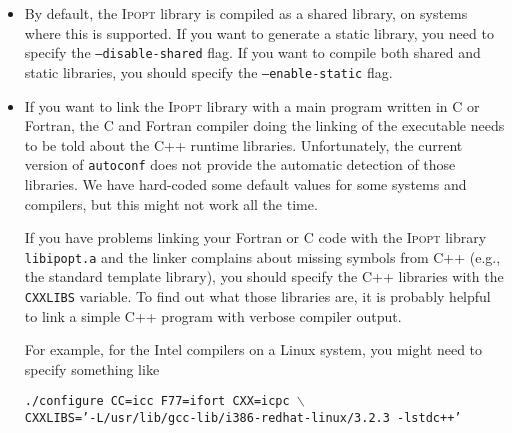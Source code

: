 \documentclass[10pt]{article}
\newcommand{\Ipopt}{\textsc{Ipopt}\xspace}
\begin{document}
\begin{itemize}
  {\tt ./configure CXX=g++-4.2.0 CC=gcc-4.2.0 F77=gfortran-4.2.0}

  In order to set the compiler flags, you should use the variables
  {\tt CXXFLAGS}, {\tt CFLAGS}, {\tt FFLAGS}.  Note, that the \Ipopt
  code uses ``{\tt dynamic\_cast}''.  Therefore it is necessary that
  the C++ code is compiled including RTTI (Run-Time Type Information).
  Some compilers need to be given special flags to do that (e.g.,
  ``{\tt -qrtti=dyna}'' for the AIX {\tt xlC} compiler).

  Please also check the generic COIN-OR help page at

  \centerline{\url{https://projects.coin-or.org/CoinHelp/wiki/user-configure\#GivingOptions}}

  for the description of more variables that can be set for {\tt
    configure}.

\item By default, the \Ipopt library is compiled as a shared library,
  on systems where this is supported.  If you want to generate a
  static library, you need to specify the {\tt --disable-shared}
  flag.  If you want to compile both shared and static libraries, you
  should specify the {\tt --enable-static} flag.

\item If you want to link the \Ipopt library with a main program
  written in C or Fortran, the C and Fortran compiler doing the
  linking of the executable needs to be told about the C++ runtime
  libraries.  Unfortunately, the current version of {\tt autoconf}
  does not provide the automatic detection of those libraries.  We
  have hard-coded some default values for some systems and compilers,
  but this might not work all the time.

  If you have problems linking your Fortran or C code with the \Ipopt
  library {\tt libipopt.a} and the linker complains about missing
  symbols from C++ (e.g., the standard template library), you should
  specify the C++ libraries with the {\tt CXXLIBS} variable.  To find out
  what those libraries are, it is probably helpful to link a  simple C++
  program with verbose compiler output.

  For example, for the Intel compilers on a Linux system, you
  might need to specify something like

  {\tt ./configure CC=icc F77=ifort CXX=icpc $\backslash$\\ \hspace*{14ex} CXXLIBS='-L/usr/lib/gcc-lib/i386-redhat-linux/3.2.3 -lstdc++'}


\end{itemize}
\end{document}
